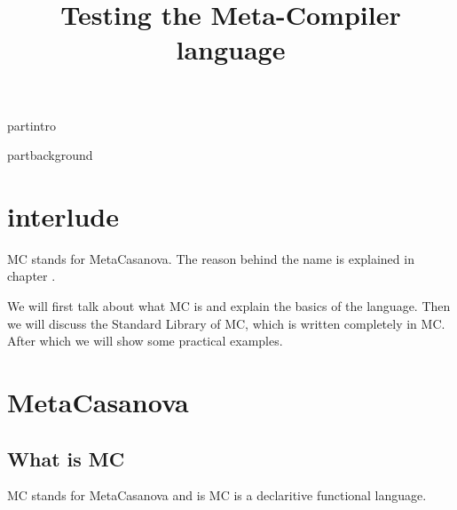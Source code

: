 


\title{Testing the Meta-Compiler language}
\author{\writer}

\begin{titlepage}
   
\end{titlepage}



\setcounter{tocdepth}{2}
\tableofcontents
\cleardoublepage
{}
\addtocounter{page}{4}



part{intro}


part{background}



\chapter{interlude}
MC stands for MetaCasanova. The reason behind the name is explained in chapter .

We will first talk about what MC is and explain the basics of the language.
Then we will discuss the Standard Library of MC, which is written completely in MC.
After which we will show some practical examples.


\chapter{MetaCasanova}

\section{What is MC}
MC stands for MetaCasanova and is MC is a declaritive functional language.
